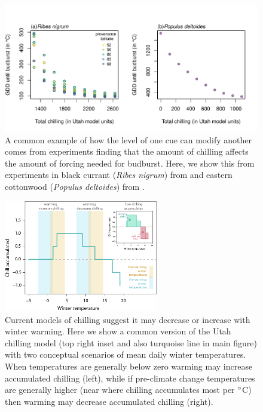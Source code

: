 \documentclass[11pt,letter]{article}
\begin{document}
\clearpage
\begin{figure}
\centering
\includegraphics[width=1\textwidth]{..//..//analyses/limitingcues/figures/gddbyutahpretty.pdf}
\caption{A common example of how the level of one cue can modify another comes from experiments finding that the amount of chilling affects the amount of forcing needed for budburst. Here, we show this from experiments in black currant (\emph{Ribes nigrum}) from \citet{Sonsteby:2014aa} and eastern cottonwood (\emph{Populus deltoides}) from \citet{Thielges:1976aa}.} %
  \label{fig:gddbyutah} 
\end{figure}

\clearpage
\begin{figure}[t!]
\centering
\includegraphics[width=0.6\textwidth]{figures/utahchill_limiting.png}
\caption{Current models of chilling suggest it may decrease or increase with winter warming. Here we show a common version of the Utah chilling model (top right inset and also turquoise line in main figure) with two conceptual scenarios of mean daily winter temperatures. When temperatures are generally below zero warming may increase accumulated chilling (left), while if pre-climate change temperatures are generally higher (near where chilling accumulates most per $\degree$C) then warming may decrease accumulated chilling (right).}
  \label{fig:chilling}
\end{figure}
\end{document}
